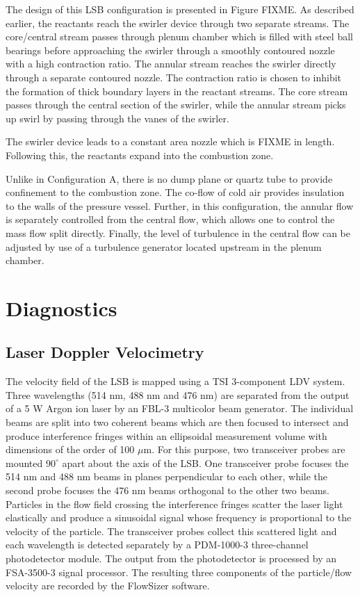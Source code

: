 The design of this LSB configuration is presented in Figure FIXME.
As described earlier, the reactants reach the swirler device through two separate streams.
The core/central stream passes through plenum chamber which is filled with steel ball bearings before approaching the swirler through a smoothly contoured nozzle with a high contraction ratio.
The annular stream reaches the swirler directly through a separate contoured nozzle.
The contraction ratio is chosen to inhibit the formation of thick boundary layers in the reactant streams.
The core stream passes through the central section of the swirler, while the annular stream picks up swirl by passing through the vanes of the swirler.

The swirler device leads to a constant area nozzle which is FIXME in length.
Following this, the reactants expand into the combustion zone.

Unlike in Configuration A, there is no dump plane or quartz tube to provide confinement to the combustion zone.
The co-flow of cold air provides insulation to the walls of the pressure vessel.
Further, in this configuration, the annular flow is separately controlled from the central flow, which allows one to control the mass flow split directly.
Finally, the level of turbulence in the central flow can be adjusted by use of a turbulence generator\cite{2011-marshall} located upstream in the plenum chamber.

\section{Diagnostics}

\subsection{Laser Doppler Velocimetry}

The velocity field of the LSB is mapped using a TSI 3-component LDV system.
Three wavelengths (514 nm, 488 nm and 476 nm) are separated from the output of a 5 W Argon ion laser by an FBL-3 multicolor beam generator.
The individual beams are split into two coherent beams which are then focused to intersect and produce interference fringes within an ellipsoidal measurement volume with dimensions of the order of 100 \(\mu\)m.
For this purpose, two transceiver probes are mounted \(90^\circ\) apart about the axis of the LSB.
One transceiver probe focuses the 514 nm and 488 nm beams in planes perpendicular to each other, while the second probe focuses the 476 nm beams orthogonal to the other two beams.
Particles in the flow field crossing the interference fringes scatter the laser light elastically and produce a sinusoidal signal whose frequency is proportional to the velocity of the particle.
The transceiver probes collect this scattered light and each wavelength is detected separately by a PDM-1000-3 three-channel photodetector module.
The output from the photodetector is processed by an FSA-3500-3 signal processor.
The resulting three components of the particle/flow velocity are recorded by the FlowSizer software.

